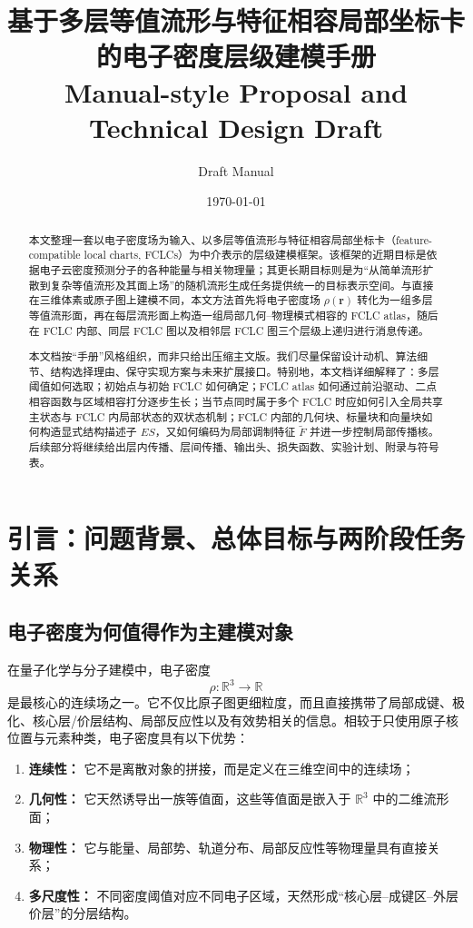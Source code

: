 \documentclass[12pt,a4paper]{ctexart}
\title{\textbf{基于多层等值流形与特征相容局部坐标卡的电子密度层级建模手册}\\
\large Manual-style Proposal and Technical Design Draft}
\author{Draft Manual}
\date{\today}
\begin{document}
\maketitle

\begin{abstract}
本文整理一套以电子密度场为输入、以多层等值流形与特征相容局部坐标卡（feature-compatible local charts, FCLCs）为中介表示的层级建模框架。该框架的近期目标是依据电子云密度预测分子的各种能量与相关物理量；其更长期目标则是为“从简单流形扩散到复杂等值流形及其面上场”的随机流形生成任务提供统一的目标表示空间。与直接在三维体素或原子图上建模不同，本文方法首先将电子密度场 \(\rho(\mathbf r)\) 转化为一组多层等值流形面，再在每层流形面上构造一组局部几何--物理模式相容的 FCLC atlas，随后在 FCLC 内部、同层 FCLC 图以及相邻层 FCLC 图三个层级上递归进行消息传递。

本文档按“手册”风格组织，而非只给出压缩主文版。我们尽量保留设计动机、算法细节、结构选择理由、保守实现方案与未来扩展接口。特别地，本文档详细解释了：多层阈值如何选取；初始点与初始 FCLC 如何确定；FCLC atlas 如何通过前沿驱动、二点相容函数与区域相容打分逐步生长；当节点同时属于多个 FCLC 时应如何引入全局共享主状态与 FCLC 内局部状态的双状态机制；FCLC 内部的几何块、标量块和向量块如何构造显式结构描述子 \(ES\)，又如何编码为局部调制特征 \(\tilde F\) 并进一步控制局部传播核。后续部分将继续给出层内传播、层间传播、输出头、损失函数、实验计划、附录与符号表。
\end{abstract}

\tableofcontents
\newpage

\section{引言：问题背景、总体目标与两阶段任务关系}

\subsection{电子密度为何值得作为主建模对象}

在量子化学与分子建模中，电子密度
\[
\rho:\mathbb R^3\to\mathbb R
\]
是最核心的连续场之一。它不仅比原子图更细粒度，而且直接携带了局部成键、极化、核心层/价层结构、局部反应性以及有效势相关的信息。相较于只使用原子核位置与元素种类，电子密度具有以下优势：

\begin{enumerate}[leftmargin=2em]
    \item \textbf{连续性：} 它不是离散对象的拼接，而是定义在三维空间中的连续场；
    \item \textbf{几何性：} 它天然诱导出一族等值面，这些等值面是嵌入于 \(\mathbb R^3\) 中的二维流形面；
    \item \textbf{物理性：} 它与能量、局部势、轨道分布、局部反应性等物理量具有直接关系；
    \item \textbf{多尺度性：} 不同密度阈值对应不同电子区域，天然形成“核心层--成键区--外层价层”的分层结构。
\end{enumerate}
\end{document}
